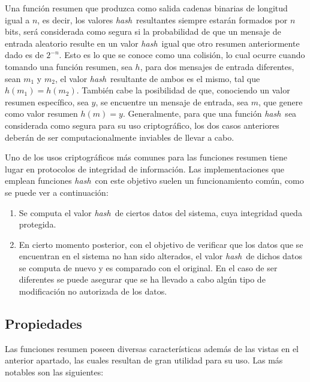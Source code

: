 \documentclass[12pt,spanish,listoffigures,listoftables]{tfgetsinf}
\newcommand{\hash}{\textit{hash}}
\begin{document}
Una función resumen que produzca como salida cadenas binarias de longitud igual a $n$, es decir, los valores \hash~resultantes siempre estarán formados por $n$ bits, será considerada como segura si la probabilidad de que un mensaje de entrada aleatorio resulte en un valor \hash~igual que otro resumen anteriormente dado es de $2^{-n}$. Esto es lo que se conoce como una colisión, lo cual ocurre cuando tomando una función resumen, sea $h$, para dos mensajes de entrada diferentes, sean $m_1$ y $m_2$, el valor \hash~resultante de ambos es el mismo, tal que $h(m_1) = h(m_2)$. También cabe la posibilidad de que, conociendo un valor resumen específico, sea $y$, se encuentre un mensaje de entrada, sea $m$, que genere como valor resumen $h(m) = y$. Generalmente, para que una función \hash~sea considerada como segura para su uso criptográfico, los dos casos anteriores deberán de ser computacionalmente inviables de llevar a cabo.

Uno de los usos criptográficos más comunes para las funciones resumen tiene lugar en protocolos de integridad de información. Las implementaciones que emplean funciones \hash~con este objetivo suelen un funcionamiento común, como se puede ver a continuación:

\begin{enumerate}

	\item Se computa el valor \hash~de ciertos datos del sistema, cuya integridad queda protegida.

	\item En cierto momento posterior, con el objetivo de verificar que los datos que se encuentran en el sistema no han sido alterados, el valor \hash~de dichos datos se computa de nuevo y es comparado con el original. En el caso de ser diferentes se puede asegurar que se ha llevado a cabo algún tipo de modificación no autorizada de los datos.

\end{enumerate}

\subsection{Propiedades}

Las funciones resumen poseen diversas características además de las vistas en el anterior apartado, las cuales resultan de gran utilidad para su uso. Las más notables son las siguientes:
\end{document}
